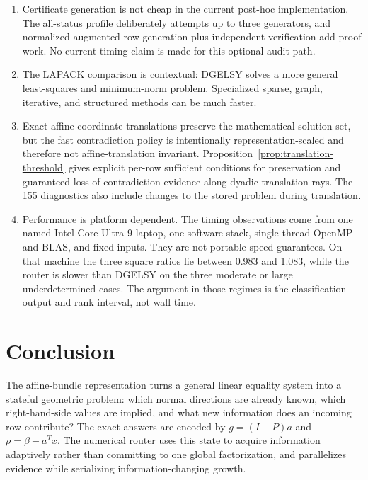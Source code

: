 \documentclass[11pt]{article}
\theoremstyle{definition}
\begin{document}
\begin{enumerate}
\item Certificate generation is not cheap in the current post-hoc implementation. The all-status profile deliberately attempts up to three generators, and normalized augmented-row generation plus independent verification add proof work. No current timing claim is made for this optional audit path.
\item The LAPACK comparison is contextual: DGELSY solves a more general least-squares and minimum-norm problem. Specialized sparse, graph, iterative, and structured methods can be much faster.
\item Exact affine coordinate translations preserve the mathematical solution set, but the fast contradiction policy is intentionally representation-scaled and therefore not affine-translation invariant. Proposition~\ref{prop:translation-threshold} gives explicit per-row sufficient conditions for preservation and guaranteed loss of contradiction evidence along dyadic translation rays. The 155 diagnostics also include changes to the stored problem during translation.
\item Performance is platform dependent. The timing observations come from one named Intel Core Ultra 9 laptop, one software stack, single-thread OpenMP and BLAS, and fixed inputs. They are not portable speed guarantees. On that machine the three square ratios lie between 0.983 and 1.083, while the router is slower than DGELSY on the three moderate or large underdetermined cases. The argument in those regimes is the classification output and rank interval, not wall time.
\end{enumerate}

\section{Conclusion}
The affine-bundle representation turns a general linear equality system into a stateful geometric problem: which normal directions are already known, which right-hand-side values are implied, and what new information does an incoming row contribute? The exact answers are encoded by $g=(I-P)a$ and $\rho=\beta-a^Tx$. The numerical router uses this state to acquire information adaptively rather than committing to one global factorization, and parallelizes evidence while serializing information-changing growth.
\end{document}
